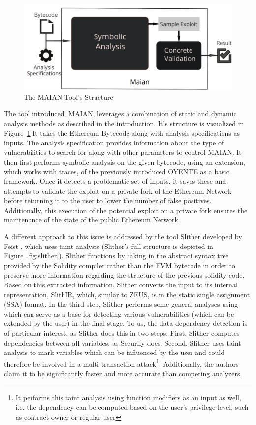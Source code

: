 \documentclass[letterpaper,twocolumn,10pt]{article}
\begin{document}
\begin{figure}
\begin{center}
\includegraphics[scale=0.2]{MAIAN}
\end{center}
\caption{\label{fig:maian} The MAIAN Tool's Structure}
\end{figure}

The tool introduced, MAIAN, leverages a combination of static and dynamic analysis methods as described in the introduction. It's structure is visualized in Figure~\ref{fig:maian} It takes the Ethereum Bytecode along with analysis specifications as inputs. The analysis specification provides information about the type of vulnerabilities to search for along with other parameters to control MAIAN. It then first performs symbolic analysis on the given bytecode, using an extension, which works with traces, of the previously introduced OYENTE as a basic framework. Once it detects a problematic set of inputs, it saves these and attempts to validate the exploit on a private fork of the Ethereum Network before returning it to the user to lower the number of false positives. Additionally, this execution of the potential exploit on a private fork ensures the maintenance of the state of the public Ethereum Network.

A different approach to this issue is addressed by the tool Slither developed by Feist \cite{feist_grieco_groce_2019}, which uses taint analysis (Slither's full structure is depicted in Figure~\ref{fig:slither}). Slither functions by taking in the abstract syntax tree provided by the Solidity compiler rather than the EVM bytecode in order to preserve more information regarding the structure of the previous solidity code. Based on this extracted information, Slither converts the input to its internal representation, SlithIR, which, similar to ZEUS, is in the static single assignment (SSA) format. In the third step, Slither performs some general analyses using which can serve as a base for detecting various vulnerabilities (which can be extended by the user) in the final stage. To us, the data dependency detection is of particular interest, as Slither does this in two steps: First, Slither computes dependencies between all variables, as Securify does. Second, Slither uses taint analysis to mark variables which can be influenced by the user and could therefore be involved in a multi-transaction attack\footnote{It performs this taint analysis using function modifiers as an input as well, i.e. the dependency can be computed based on the user's privilege level, such as contract owner or regular user}. Additionally, the authors claim it to be significantly faster and more accurate than competing analyzers.
\end{document}
